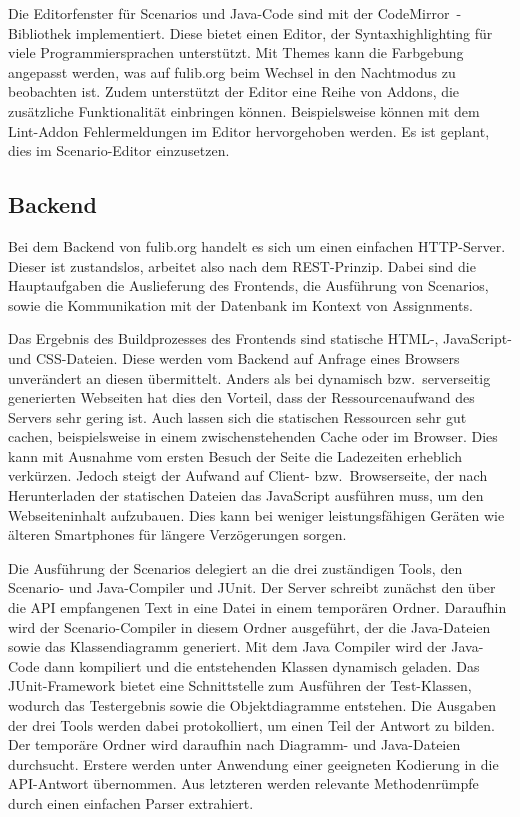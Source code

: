 Die Editorfenster für Scenarios und Java-Code sind mit der CodeMirror~\cite{codemirror}-Bibliothek implementiert.
Diese bietet einen Editor, der Syntaxhighlighting für viele Programmiersprachen unterstützt.
Mit Themes kann die Farbgebung angepasst werden, was auf fulib.org beim Wechsel in den Nachtmodus zu beobachten ist.
Zudem unterstützt der Editor eine Reihe von Addons, die zusätzliche Funktionalität einbringen können.
Beispielsweise können mit dem Lint-Addon Fehlermeldungen im Editor hervorgehoben werden.
Es ist geplant, dies im Scenario-Editor einzusetzen.

\subsection{Backend}\label{subsec:backend}

Bei dem Backend von fulib.org handelt es sich um einen einfachen HTTP-Server.
Dieser ist zustandslos, arbeitet also nach dem REST-Prinzip.
Dabei sind die Hauptaufgaben die Auslieferung des Frontends,
die Ausführung von Scenarios,
sowie die Kommunikation mit der Datenbank im Kontext von Assignments.

Das Ergebnis des Buildprozesses des Frontends sind statische HTML-, JavaScript- und CSS-Dateien.
Diese werden vom Backend auf Anfrage eines Browsers unverändert an diesen übermittelt.
Anders als bei dynamisch bzw.\ serverseitig generierten Webseiten hat dies den Vorteil,
dass der Ressourcenaufwand des Servers sehr gering ist.
Auch lassen sich die statischen Ressourcen sehr gut cachen,
beispielsweise in einem zwischenstehenden Cache oder im Browser.
Dies kann mit Ausnahme vom ersten Besuch der Seite die Ladezeiten erheblich verkürzen.
Jedoch steigt der Aufwand auf Client- bzw.\ Browserseite,
der nach Herunterladen der statischen Dateien das JavaScript ausführen muss, um den Webseiteninhalt aufzubauen.
Dies kann bei weniger leistungsfähigen Geräten wie älteren Smartphones für längere Verzögerungen sorgen.

Die Ausführung der Scenarios delegiert an die drei zuständigen Tools,
den Scenario- und Java-Compiler und JUnit.
Der Server schreibt zunächst den über die API empfangenen Text in eine Datei in einem temporären Ordner.
Daraufhin wird der Scenario-Compiler in diesem Ordner ausgeführt,
der die Java-Dateien sowie das Klassendiagramm generiert.
Mit dem Java Compiler wird der Java-Code dann kompiliert und die entstehenden Klassen dynamisch geladen.
Das JUnit-Framework bietet eine Schnittstelle zum Ausführen der Test-Klassen,
wodurch das Testergebnis sowie die Objektdiagramme entstehen.
Die Ausgaben der drei Tools werden dabei protokolliert, um einen Teil der Antwort zu bilden.
Der temporäre Ordner wird daraufhin nach Diagramm- und Java-Dateien durchsucht.
Erstere werden unter Anwendung einer geeigneten Kodierung in die API-Antwort übernommen.
Aus letzteren werden relevante Methodenrümpfe durch einen einfachen Parser extrahiert.

